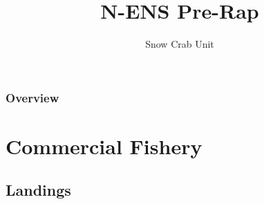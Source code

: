 \usepackage{graphicx} %
\usepackage{booktabs} %


\title[Science / Industry Pre-Rap]{N-ENS Pre-Rap} %

\author{Snow Crab Unit} %
\date{\the\year} %



\begin{frame}
\titlepage %
\end{frame}

\begin{frame}
\frametitle{Overview} %
\tableofcontents %
\end{frame}



\section{Commercial Fishery}
\subsection{Landings}

